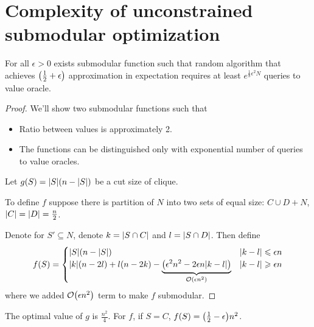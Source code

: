 \section{Complexity of unconstrained submodular optimization}
\begin{theorem}
	For all $\epsilon>0$ exists submodular function such that random algorithm that achieves  $\qty(\frac{1}{2}+\epsilon)$ approximation in expectation requires at least $e^{\frac{1}{8}\epsilon^2 N}$ queries to value oracle.
	\begin{proof}
		We'll show two submodular functions such that
		\begin{itemize}
			\item Ratio between values is approximately 2.
			\item The functions can be distinguished only with exponential number of queries to value oracles.
		\end{itemize}
	
	Let $g(S) = \abs{S} \qty(n-\abs{S})$ be a cut size of clique.
	
	To define $f$ suppose there is partition of $N$ into two sets of equal size: $C\cup D+N$, $\abs{C}=\abs{D}=\frac{n}{2}$. 
	
	Denote for $S'\subseteq N$, denote  $k=\abs{S\cap C}$ and $l=\abs{S\cap D}$. Then define
	\begin{align}
	f(S) = \begin{cases}
	\abs{S} \qty(n-\abs{S}) & \abs{k-l} \leqslant \epsilon n\\
	\abs{k} \qty(n-2l) + l(n-2k) - \underbrace{\qty(\epsilon^2 n^2 - 2\epsilon n \abs{k-l})}_{\order{\epsilon n^2}}& \abs{k-l} \geqslant \epsilon n\\
	\end{cases}
	\end{align}
	where we added $\order{\epsilon n^2}$ term to make $f$ submodular.
	\end{proof}

	The optimal value of $g$ is $\frac{n^2}{4}$. For $f$, if $S=C$, $f(S)=\qty(\frac{1}{2}-\epsilon)n^2$.
	

\end{theorem}
